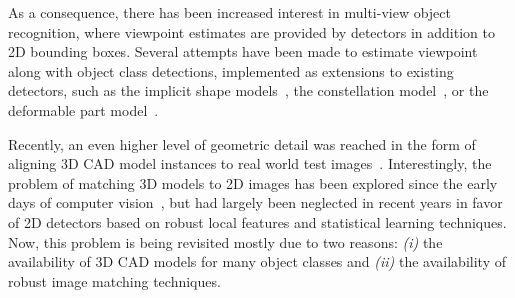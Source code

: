 As a consequence, there has been increased interest in multi-view object
recognition, where viewpoint estimates are provided by
detectors in addition to 2D bounding boxes. Several attempts have been
made to estimate viewpoint along with object class detections,
implemented as extensions to existing detectors, such as the implicit
shape models~\cite{sun10eccv}, the constellation model~\cite{stark10bmvc}, or the
deformable part model~\cite{Felzenszwalb10, gu10eccv,Xiang12,Pepik12,Fidler12,Hejrati14}.

Recently, an even higher level of geometric detail was reached in the
form of aligning
3D CAD model instances to real world test images~\cite{Aubry14,
  Lim14,Kholgade14, Chen13, Kostas14}. Interestingly, the problem of matching 3D models to 2D
images has been explored since the early days of computer
vision~\cite{Lowe87}, but had largely been neglected in recent years
in favor of 2D detectors based on robust local features and
statistical learning techniques. Now, this problem is being revisited
mostly due to two reasons: {\em (i)} the availability of 3D CAD models
for many object classes and {\em (ii)} the availability of robust
image matching techniques.
%
%
%
%

